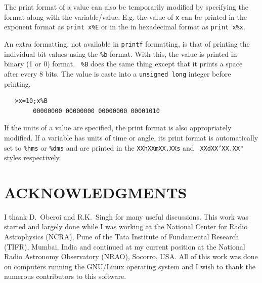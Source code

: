 \documentclass[12pt]{article}
\begin{document}
The print format of a value can also be temporarily modified by
specifying the format along with the variable/value.  E.g. the value
of {\tt x} can be printed in the exponent format as {\tt print x\%E}
or in the in hexadecimal format as {\tt print x\%x}.

An extra formatting, not available in {\tt printf} formatting, is that
of printing the individual bit values using the {\tt \%b} format.
With this, the value is printed in binary (1 or 0) format.  {\tt
\%B} does the same thing except that it prints a space after every 8 bits.
The value is caste into a {\tt unsigned long} integer before
printing.
\begin{verbatim}
   >x=10;x%B
        00000000 00000000 00000000 00001010
\end{verbatim}
If the units of a value are specified, the print format is also
appropriately modified.  If a variable has units of time or angle, its
print format is automatically set to {\tt \%hms} or {\tt \%dms}
and are printed in the {\tt XXhXXmXX.XXs} and {\tt
XXdXX{\texttt{'}}XX.XX{\texttt{"}}} styles respectively.


\section*{ACKNOWLEDGMENTS}
I thank D.~Oberoi and R.K.~Singh for many useful discussions.  This
work was started and largely done while I was working at the National
Center for Radio Astrophysics (NCRA), Pune of the Tata Institute of
Fundamental Research (TIFR), Mumbai, India and continued at my current
position at the National Radio Astronomy Observatory (NRAO), Socorro,
USA.  All of this work was done on computers running the GNU/Linux
operating system and I wish to thank the numerous contributors to this
software.

%




\end{document}
